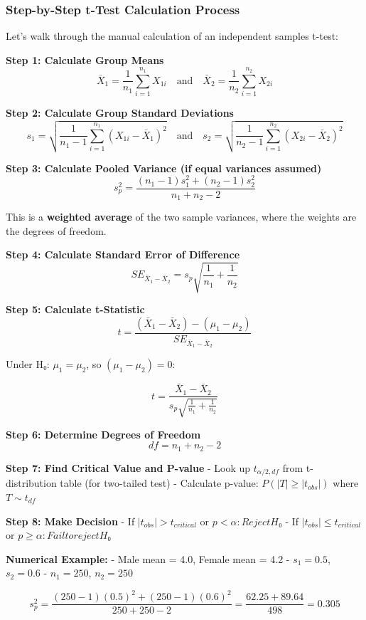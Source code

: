 \documentclass[11pt]{article}
\begin{document}
    \subsubsection{\texorpdfstring{\textbf{Step-by-Step t-Test Calculation
Process}}{Step-by-Step t-Test Calculation Process}}\label{step-by-step-t-test-calculation-process}

Let's walk through the manual calculation of an independent samples
t-test:

\textbf{Step 1: Calculate Group Means}
\[\bar{X}_1 = \frac{1}{n_1}\sum_{i=1}^{n_1} X_{1i} \quad \text{and} \quad \bar{X}_2 = \frac{1}{n_2}\sum_{i=1}^{n_2} X_{2i}\]

\textbf{Step 2: Calculate Group Standard Deviations}
\[s_1 = \sqrt{\frac{1}{n_1-1}\sum_{i=1}^{n_1}(X_{1i} - \bar{X}_1)^2} \quad \text{and} \quad s_2 = \sqrt{\frac{1}{n_2-1}\sum_{i=1}^{n_2}(X_{2i} - \bar{X}_2)^2}\]

\textbf{Step 3: Calculate Pooled Variance (if equal variances assumed)}
\[s_p^2 = \frac{(n_1-1)s_1^2 + (n_2-1)s_2^2}{n_1 + n_2 - 2}\]

This is a \textbf{weighted average} of the two sample variances, where
the weights are the degrees of freedom.

\textbf{Step 4: Calculate Standard Error of Difference}
\[SE_{\bar{X}_1 - \bar{X}_2} = s_p\sqrt{\frac{1}{n_1} + \frac{1}{n_2}}\]

\textbf{Step 5: Calculate t-Statistic}
\[t = \frac{(\bar{X}_1 - \bar{X}_2) - (\mu_1 - \mu_2)}{SE_{\bar{X}_1 - \bar{X}_2}}\]

Under H₀: \(\mu_1 = \mu_2\), so \((\mu_1 - \mu_2) = 0\):

\[t = \frac{\bar{X}_1 - \bar{X}_2}{s_p\sqrt{\frac{1}{n_1} + \frac{1}{n_2}}}\]

\textbf{Step 6: Determine Degrees of Freedom} \[df = n_1 + n_2 - 2\]

\textbf{Step 7: Find Critical Value and P-value} - Look up
\(t_{\alpha/2, df}\) from t-distribution table (for two-tailed test) -
Calculate p-value: \(P(|T| \geq |t_{obs}|)\) where \(T \sim t_{df}\)

\textbf{Step 8: Make Decision} - If \(|t_{obs}| > t_{critical}\) or
\(p < \alpha: Reject H₀\) - If \(|t_{obs}| \leq t_{critical}\) or
\(p \geq \alpha: Fail to reject H₀\)

\textbf{Numerical Example:} - Male mean = 4.0, Female mean = 4.2 -
\(s_1 = 0.5\), \(s_2 = 0.6\) - \(n_1 = 250\), \(n_2 = 250\)

\[s_p^2 = \frac{(250-1)(0.5)^2 + (250-1)(0.6)^2}{250 + 250 - 2} = \frac{62.25 + 89.64}{498} = 0.305\]
\end{document}
